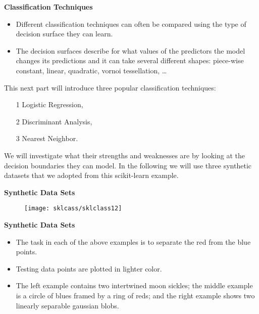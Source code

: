 \documentclass[MASTER.tex]{subfiles}
\begin{document}
\begin{frame}[fragile]
\Large
\textbf{Classification Techniques}
\begin{itemize}
\item Different classification techniques can often be compared using the type of decision surface they can learn. \item The decision surfaces describe for what values of the predictors the model changes its predictions and it can take several different shapes: piece-wise constant, linear, quadratic, vornoi tessellation, \ldots
\end{itemize}

\end{frame}
\begin{frame}[fragile]
\Large
This next part will introduce three popular classification techniques: 
\begin{itemize}
\item[1] Logistic Regression, 
\item[2] Discriminant Analysis, 
\item[3] Nearest Neighbor.
\end{itemize} We will investigate what their strengths and weaknesses are by looking at the decision boundaries they can model. In the following we will use three synthetic datasets that we adopted from this scikit-learn example.
\end{frame}
\begin{frame}
	\textbf{Synthetic Data Sets}
\begin{figure}
\centering
\texttt{[image: sklcass/sklclass12]}

\end{figure}
\end{frame}
\begin{frame}
\textbf{Synthetic Data Sets}
\begin{itemize}
\item The task in each of the above examples is to separate the red from the blue points. 
\item Testing data points are plotted in lighter color. 
\item The left example contains two intertwined moon sickles; the middle example is a circle of blues framed by a ring of reds; and the right example shows two linearly separable gaussian blobs.
\end{itemize}

\end{frame}
\end{document}
